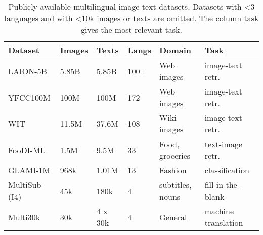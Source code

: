 \documentclass{bmvc2k}
\begin{document}
\begin{table}[htb]
\small
\centering
\caption{\label{tab:multilingual} Publicly available multilingual image-text datasets. Datasets with <3 languages and with <10k images or texts are omitted. The column task gives the most relevant task.}
\vspace{1mm}
    \setlength{\tabcolsep}{4pt}
\renewcommand{\arraystretch}{1}
\begin{tabular}{|l|l|l|l|l|m{2.9cm}|}
\hline
Dataset                          & Images        & Texts         & Langs     & Domain           & Task \\
\hline
LAION-5B \cite{LAION5B}          & 5.85B          & 5.85B         & 100+     & Web images        & image-text retr. \\
YFCC100M \cite{YFCC100M}         & 100M           & 100M          & 172      & Web images        & image-text retr. \\
WIT \cite{wit}                   & 11.5M          & 37.6M         & 108      & Wiki images       & image-text retr. \\
FooDI-ML \cite{foodi}            & 1.5M           & 9.5M          & 33       & Food, groceries   & text-image retr. \\
GLAMI-1M  & 968k          & 1.01M         & 13       & Fashion           & classification   \\
MultiSub (I4) \cite{multisub}    & 45k            & 180k         & 4        & subtitles, nouns  & fill-in-the-blank \\
Multi30k \cite{WMT18,multi30kGe,multi30kFr,multi30kCz}  & 30k    & 4 x 30k  & 4       & General           & machine translation \\
\hline
\end{tabular}
\end{table}
\end{document}
